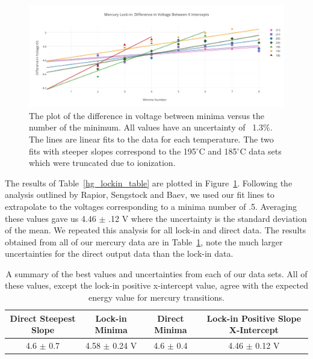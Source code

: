 \documentclass[prb,preprint]{revtex4-1}
\begin{document}
\begin{figure}[h!]
\centering

\includegraphics[width=6in]{lockin_intercepts.pdf}
\caption{The plot of the difference in voltage between minima versus the number of the minimum. All values have an uncertainty of ~1.3$\%$. The lines are linear fits to the data for each temperature. The two fits with steeper slopes correspond to the 195$^{\circ}$C and 185$^{\circ}$C data sets which were truncated due to ionization.}

\label{lockin_intercepts}
\end{figure}

The results of Table~\ref{hg_lockin_table} are plotted in Figure~\ref{lockin_intercepts}. Following the analysis outlined by Rapior, Sengstock and Baev, we used our fit lines to extrapolate to the voltages corresponding to a minima number of .5. Averaging these values gave us 4.46 $\pm$ .12 V where the uncertainty is the standard deviation of the mean. We repeated this analysis for all lock-in and direct data. The results obtained from all of our mercury data are in Table~\ref{hg_results}, note the much larger uncertainties for the direct output data than the lock-in data.  


\begin{table}[h!]
\centering
\caption{A summary of the best values and uncertainties from each of our data sets. All of these values, except the lock-in positive x-intercept value, agree with the expected energy value for mercury transitions.}
\begin{ruledtabular}
\begin{tabular}{c c c c}
 Direct Steepest Slope & Lock-in Minima & Direct Minima & Lock-in Positive Slope X-Intercept   \\
\hline	%

 4.6 $\pm$ 0.7 & 4.58 $\pm$ 0.24 V & 4.6 $\pm$ 0.4 & 4.46 $\pm$ 0.12 V  \\

\end{tabular}
\end{ruledtabular}
\label{hg_results}
\end{table}
\end{document}
